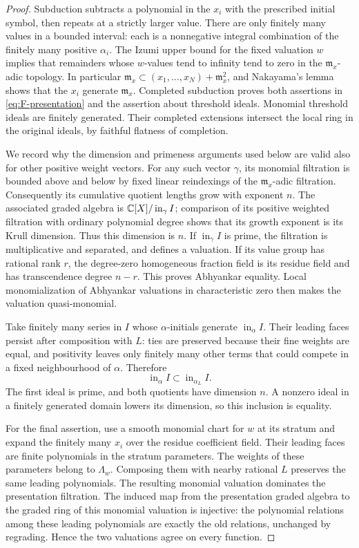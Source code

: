 \begin{proof}
Subduction subtracts a polynomial in the $x_i$ with the prescribed
initial symbol, then repeats at a strictly larger value.  There are
only finitely many values in a bounded interval: each is a
nonnegative integral combination of the finitely many positive
$\alpha_i$.  The Izumi upper bound for the fixed valuation $w$
implies that remainders whose $w$-values tend to infinity tend to
zero in the $\mathfrak m_x$-adic topology.  In particular
$\mathfrak m_x\subset(x_1,\ldots,x_N)+\mathfrak m_x^2$, and
Nakayama's lemma shows that the $x_i$ generate $\mathfrak m_x$.
Completed subduction proves both assertions in
\eqref{eq:F-presentation} and the assertion about threshold ideals.
Monomial threshold ideals are finitely generated.  Their completed
extensions intersect the local ring in the original ideals, by
faithful flatness of completion.

We record why the dimension and primeness arguments used below are
valid also for other positive weight vectors.  For any such vector
$\gamma$, its monomial filtration is bounded above and below by
fixed linear reindexings of the $\mathfrak m_x$-adic filtration.
Consequently its cumulative quotient lengths grow with exponent
$n$.  The associated graded algebra is
$\mathbb C[X]/\operatorname{in}_{\gamma}I$; comparison of its positive
weighted filtration with ordinary polynomial degree shows that its
growth exponent is its Krull dimension.  Thus this dimension is
$n$.  If $\operatorname{in}_{\gamma}I$ is prime, the filtration is
multiplicative and separated, and defines a valuation.  If its
value group has rational rank $r$, the degree-zero homogeneous
fraction field is its residue field and has transcendence degree
$n-r$.  This proves Abhyankar equality.  Local monomialization of
Abhyankar valuations in characteristic zero
\cite[Proposition~3.7]{JonssonMustata} then makes the
valuation quasi-monomial.

Take finitely many series in $I$ whose $\alpha$-initials generate
$\operatorname{in}_{\alpha}I$.  Their leading faces persist after
composition with $L$: ties are preserved because their fine
weights are equal, and positivity leaves only finitely many other
terms that could compete in a fixed neighbourhood of $\alpha$.
Therefore
\[
 \operatorname{in}_{\alpha}I\subset
 \operatorname{in}_{\alpha_L}I.
\]
The first ideal is prime, and both quotients have dimension $n$.
A nonzero ideal in a finitely generated domain lowers its
dimension, so this inclusion is equality.

For the final assertion, use a smooth monomial chart for $w$ at its
stratum and expand the finitely many $x_i$ over the residue
coefficient field.  Their leading faces are finite polynomials in
the stratum parameters.  The weights of these parameters belong
to $\Lambda_w$.  Composing them with nearby rational $L$ preserves
the same leading polynomials.  The resulting monomial valuation
dominates the presentation filtration.  The induced map from the
presentation graded algebra to the graded ring of this monomial
valuation is injective: the polynomial relations among these
leading polynomials are exactly the old relations, unchanged by
regrading.  Hence the two valuations agree on every function.
\end{proof}

